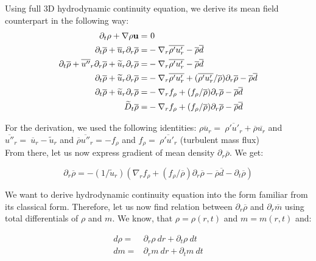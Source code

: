 \documentclass[10pt,paper=a4]{report}
\newcommand{\eht}{\overline}
\newcommand{\fht}{\widetilde}
\begin{document}
Using full 3D hydrodynamic continuity equation, we derive its mean field counterpart in the following way: \\

\begin{align}
\partial_t \rho + \nabla \rho {\bf u} = & \ 0  \nonumber \\
\partial_t \eht{\rho} + \eht{u}_r \partial_r \eht{\rho} = & -\nabla_r \eht{\rho'u'_r} - \eht{\rho} \eht{d}  \nonumber  \\
\partial_t \eht{\rho} + \eht{u''}_r \partial_r \eht{\rho} + \fht{u}_r \partial_r \eht{\rho} = & - \nabla_r \eht{\rho' u'_r} - \eht{\rho}\eht{d}  \nonumber  \\
\partial_t \eht{\rho} + \fht{u}_r \partial_r \eht{\rho} = & - \nabla_r \eht{\rho' u'_r} + (\eht{\rho' u'_r}/\eht{\rho})\partial_r \eht{\rho} - \eht{\rho}\eht{d} \nonumber  \\
\partial_t \eht{\rho} + \fht{u}_r \partial_r \eht{\rho} = & - \nabla_r f_\rho + (f_\rho / \eht{\rho})\partial_r \eht{\rho} - \eht{\rho}\eht{d}  \nonumber \\
\fht{D}_t \eht{\rho} = & - \nabla_r f_\rho + (f_\rho / \eht{\rho})\partial_r \eht{\rho} - \eht{\rho}\eht{d} \nonumber 
\end{align}

\noindent
For the derivation, we used the following identities: $\eht{\rho u_r} = \ \eht{\rho' u'_r} + \eht{\rho} \eht{u_r}$ and $\eht{u''}_r =  \ \eht{u}_r - \fht{u}_r $ and $\eht{\rho} \eht{u''}_r =  -f_\rho $ and $f_\rho = \ \eht{\rho' u'_r}$ (turbulent mass flux) \\

\noindent
From there, let us now express gradient of mean density $\partial_r \eht{\rho}$. We get:

\begin{equation}
  \partial_r \eht{\rho} = -(1/\fht{u}_r) \left( \nabla_r f_\rho + (f_\rho / \eht{\rho})\partial_r \eht{\rho} - \eht{\rho}\eht{d} - \partial_t \eht{\rho} \right)
\label{eq:gradrho}
\end{equation}

\noindent
We want to derive hydrodynamic continuity equation into the form familiar from its classical form. Therefore, let us now find relation between $\partial_r \eht{\rho}$ and $\partial_r \eht{m}$ using total differentials of $\rho$ and $m$. We know, that $\rho = \rho(r,t)$ and $m = m(r,t)$ and:

\begin{align}
d \rho = & \partial_r \rho \ d r + \partial_t \rho \ dt \nonumber \\
d m    = & \partial_r m \ d r + \partial_t m \ dt \nonumber
\label{eq:totaldiff}
\end{align}
\end{document}
